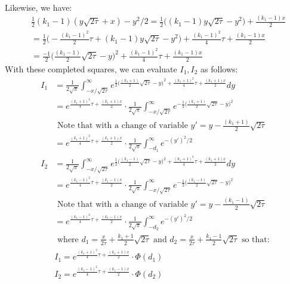 \documentclass[12pt,twoside, letter]{exam}
\theoremstyle{definition}
\begin{document}
\begin{itemize}
\begin{solution}
\begin{align*}
        \end{align*}
        Likewise, we have:
        \begin{align*}
          &\frac{1}{2}(k_1 - 1)(y\sqrt{2\tau}+x) - y^2/2 = \frac{1}{2}\bigg((k_1 - 1)y\sqrt{2\tau} - y^2\bigg) + \frac{(k_1 - 1)x}{2} \\
          &= \frac{1}{2}\bigg(-\frac{(k_1-1)^2}{2}\tau + (k_1 - 1)y\sqrt{2\tau} - y^2\bigg) + \frac{(k_1-1)^2}{4}\tau + \frac{(k_1 - 1)x}{2} \\
          &= \frac{-1}{2}\bigg(\frac{(k_1 - 1)}{2}\sqrt{2\tau} - y \bigg)^2 + \frac{(k_1-1)^2}{4}\tau + \frac{(k_1 - 1)x}{2}
        \end{align*}
        With these completed squares, we can evaluate $I_1, I_2$ as follows:
        \begin{align*}
          I_1 &= \frac{1}{2\sqrt{\pi}}\int^{\infty}_{-x/\sqrt{2\tau}} e^{\frac{1}{2}\bigg(\frac{(k_1 + 1)}{2}\sqrt{2\tau} - y \bigg)^2 + \frac{(k_1+1)^2}{4}\tau + \frac{(k_1 + 1)x}{2}} dy \\
          &= e^{\frac{(k_1+1)^2}{4}\tau + \frac{(k_1 + 1)x}{2}} \cdot \frac{1}{2\sqrt{\pi}}\int^{\infty}_{-x/\sqrt{2\tau}} e^{-\frac{1}{2}\bigg(\frac{(k_1 + 1)}{2}\sqrt{2\tau} - y \bigg)^2} \\
          &\text{ Note that with a change of variable $y' = y - \frac{(k_1 + 1)}{2}\sqrt{2\tau}$} \\
          &= e^{\frac{(k_1+1)^2}{4}\tau + \frac{(k_1 + 1)x}{2}} \cdot \frac{1}{2\sqrt{\pi}}\int^{\infty}_{-d_1} e^{-(y')^2/2} \\
          I_2 &= \frac{1}{2\sqrt{\pi}}\int^{\infty}_{-x/\sqrt{2\tau}} e^{\frac{1}{2}\bigg(\frac{(k_1 - 1)}{2}\sqrt{2\tau} - y \bigg)^2 + \frac{(k_1+1)^2}{4}\tau + \frac{(k_1 + 1)x}{2}} dy \\
          &= e^{\frac{(k_1-1)^2}{4}\tau + \frac{(k_1 - 1)x}{2}} \cdot \frac{1}{2\sqrt{\pi}}\int^{\infty}_{-x/\sqrt{2\tau}} e^{-\frac{1}{2}\bigg(\frac{(k_1 - 1)}{2}\sqrt{2\tau} - y \bigg)^2} \\
          &\text{ Note that with a change of variable $y' = y - \frac{(k_1 - 1)}{2}\sqrt{2\tau}$} \\
          &= e^{\frac{(k_1-1)^2}{4}\tau + \frac{(k_1 - 1)x}{2}} \cdot \frac{1}{2\sqrt{\pi}}\int^{\infty}_{-d_2} e^{-(y')^2/2} \\
          &\text{ where $d_1 = \frac{x}{2\tau} + \frac{k_1 + 1}{2}\sqrt{2\tau}$ and $d_2 = \frac{x}{2\tau} + \frac{k_1 - 1}{2}\sqrt{2\tau}$ so that:} \\
          &I_1 = e^{\frac{(k_1+1)^2}{4}\tau + \frac{(k_1 + 1)x}{2}} \cdot \Phi(d_1) \\
          &I_2 = e^{\frac{(k_1-1)^2}{4}\tau + \frac{(k_1 - 1)x}{2}} \cdot \Phi(d_2)
        \end{align*}
      \end{solution}


\end{itemize}
\end{document}
